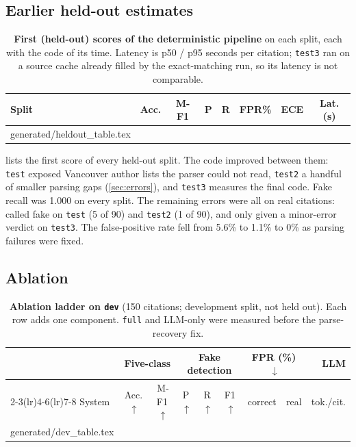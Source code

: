 \documentclass[10pt,twocolumn,a4paper]{article}
\makeatletter
\newcommand{\tabinput}[1]{\@@input #1 }  %
\makeatother
\begin{document}
\subsection{Earlier held-out estimates}
\begin{table}[t]
\centering
\caption{\textbf{First (held-out) scores of the deterministic pipeline} on each split, each with the
code of its time. Latency is p50 / p95 seconds per citation; \texttt{test3} ran on a source cache
already filled by the exact-matching run, so its latency is not comparable.}
\label{tab:heldout}
\scriptsize
\setlength{\tabcolsep}{2.4pt}
\begin{tabular}{@{}lccccccc@{}}
\toprule
Split & Acc. & M-F1 & P & R & FPR\% & ECE & Lat. (s) \\
\midrule
\tabinput{generated/heldout_table.tex}
\bottomrule
\end{tabular}
\end{table}

 lists the first score of every held-out split. The code improved between them:
\texttt{test} exposed Vancouver author lists the parser could not read, \texttt{test2} a handful of
smaller parsing gaps (\cref{sec:errors}), and \texttt{test3} measures the final code. Fake recall was
1.000 on every split. The remaining errors were all on real citations: called fake on \texttt{test}
(5 of 90) and \texttt{test2} (1 of 90), and only given a minor-error verdict on \texttt{test3}. The
false-positive rate fell from 5.6\% to 1.1\% to 0\% as parsing failures were fixed.

\subsection{Ablation}
\begin{table}[t]
\centering
\caption{\textbf{Ablation ladder on \texttt{dev}} (150 citations; development split, not held out).
Each row adds one component. \texttt{full} and LLM-only were measured before the parse-recovery fix.}
\label{tab:ablation}
\small
\setlength{\tabcolsep}{5pt}
\begin{tabular}{@{}lcccccccr@{}}
\toprule
 & \multicolumn{2}{c}{Five-class} & \multicolumn{3}{c}{Fake detection} & \multicolumn{2}{c}{FPR (\%)\,$\downarrow$} & LLM \\
\cmidrule(lr){2-3}\cmidrule(lr){4-6}\cmidrule(lr){7-8}
System & Acc.\,$\uparrow$ & M-F1\,$\uparrow$ & P\,$\uparrow$ & R\,$\uparrow$ & F1\,$\uparrow$ & correct & real & tok./cit. \\
\midrule
\tabinput{generated/dev_table.tex}
\bottomrule
\end{tabular}
\end{table}
\end{document}
